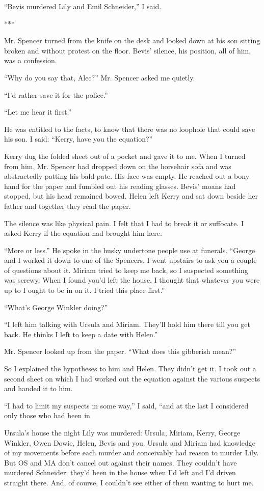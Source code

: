 \documentclass{novel}
\begin{document}
“Bevis murdered Lily and Emil Schneider,” I said.

***

Mr. Spencer turned from the knife on the desk and looked down at his son sitting broken and without protest on the floor. Bevis’ silence, his position, all of him, was a confession.

“Why do you say that, Alec?” Mr. Spencer asked me quietly.

“I’d rather save it for the police.”

“Let me hear it first.”

He was entitled to the facts, to know that there was no loophole that could save his son. I said: “Kerry, have you the equation?”

Kerry dug the folded sheet out of a pocket and gave it to me. When I turned from him, Mr. Spencer had dropped down on the horsehair sofa and was abstractedly patting his bald pate. His face was empty. He reached out a bony hand for the paper and fumbled out his reading glasses. Bevis’ moans had stopped, but his head remained bowed. Helen left Kerry and sat down beside her father and together they read the paper.

The silence was like physical pain. I felt that I had to break it or suffocate. I asked Kerry if the equation had brought him here.

“More or less.” He spoke in the husky undertone people use at funerals. “George and I worked it down to one of the Spencers. I went upstairs to ask you a couple of questions about it. Miriam tried to keep me back, so I suspected something was screwy. When I found you’d left the house, I thought that whatever you were up to I ought to be in on it. I tried this place first.”

“What’s George Winkler doing?”

“I left him talking with Ursula and Miriam. They’ll hold him there till you get back. He thinks I left to keep a date with Helen.”

Mr. Spencer looked up from the paper. “What does this gibberish mean?”

So I explained the hypotheses to him and Helen. They didn’t get it. I took out a second sheet on which I had worked out the equation against the various suspects and handed it to him.

“I had to limit my suspects in some way,” I said, “and at the last I considered only those who had been in

Ursula’s house the night Lily was murdered: Ursula, Miriam, Kerry, George Winkler, Owen Dowie, Helen, Bevis and you. Ursula and Miriam had knowledge of my movements before each murder and conceivably had reason to murder Lily. But OS and MA don’t cancel out against their names. They couldn’t have murdered Schneider; they’d been in the house when I’d left and I’d driven straight there. And, of course, I couldn’t see either of them wanting to hurt me.
\end{document}
